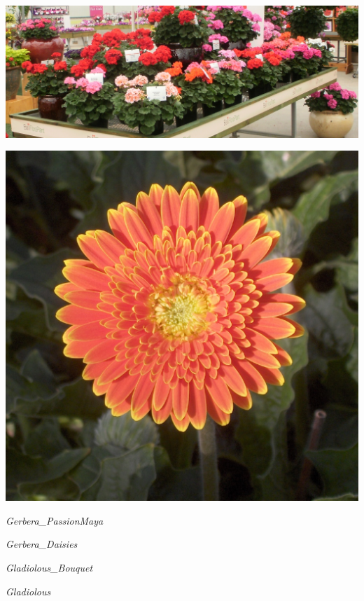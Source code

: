 \documentclass{article}
\begin{document}
\begin{center}
\includegraphics[width=0.9\textheight, angle=90]{../Geranium.jpg}
\end{center}
\newpage

\begin{center}
\includegraphics[width=0.9\textheight, angle=90]{../Gerbera.jpg}
\end{center}
\newpage

\noindent   
\vfill
\centerline{{\Large\emph{Gerbera_PassionMaya}}}
\vfill
\newpage

\noindent   
\vfill
\centerline{{\Large\emph{Gerbera_Daisies}}}
\vfill
\newpage

\noindent   
\vfill
\centerline{{\Large\emph{Gladiolous_Bouquet}}}
\vfill
\newpage

\noindent   
\vfill
\centerline{{\Large\emph{Gladiolous}}}
\vfill
\newpage
\end{document}
